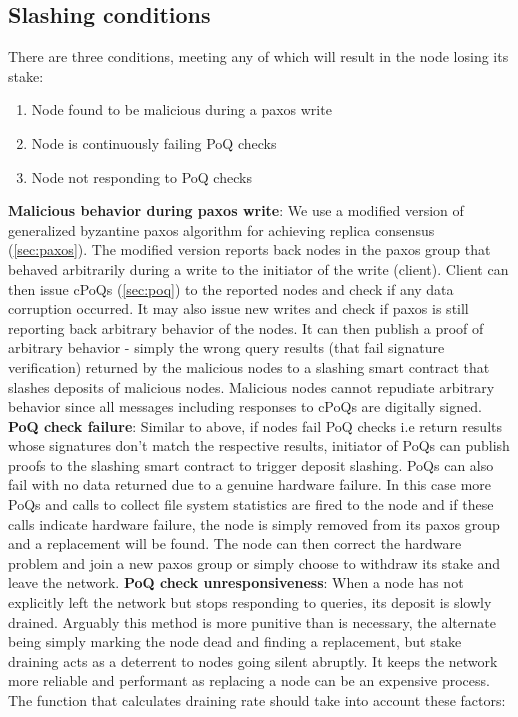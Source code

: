 \subsection{Slashing conditions} \label{sec:slashing}
 There are three conditions, meeting any of which will result in the node losing its stake:
 \begin{enumerate}
 	\item Node found to be malicious during a paxos write
 	\item Node is continuously failing PoQ checks
 	\item Node not responding to PoQ checks
 \end{enumerate}
\textbf{Malicious behavior during paxos write}: We use a modified version of generalized byzantine paxos algorithm \cite{byzantine_paxos} for achieving replica consensus (\cref{sec:paxos}). The modified version reports back nodes in the paxos group that behaved arbitrarily during a write to the initiator of the write (client). Client can then issue cPoQs (\cref{sec:poq}) to the reported nodes and check if any data corruption occurred. It may also issue new writes and check if paxos is still reporting back arbitrary behavior of the nodes. It can then publish a proof of arbitrary behavior - simply the wrong query results (that fail signature verification) returned by the malicious nodes to a slashing smart contract that slashes deposits of malicious nodes. Malicious nodes cannot repudiate arbitrary behavior since all messages including responses to cPoQs are digitally signed.
\newline\newline
\textbf{PoQ check failure}: Similar to above, if nodes fail PoQ checks i.e return results whose signatures don't match the respective results, initiator of PoQs can publish proofs to the slashing smart contract to trigger deposit slashing. PoQs can also fail with no data returned due to a genuine hardware failure. In this case more PoQs and calls to collect file system statistics are fired to the node and if these calls indicate hardware failure, the node is simply removed from its paxos group and a replacement will be found. The node can then correct the hardware problem and join a new paxos group or simply choose to withdraw its stake and leave the network.
\newline\newline
\textbf{PoQ check unresponsiveness}: When a node has not explicitly left the network but stops responding to queries, its deposit is slowly drained. Arguably this method is more punitive than is necessary, the alternate being simply marking the node dead and finding a replacement, but stake draining acts as a deterrent to nodes going silent abruptly. It keeps the network more reliable and performant as replacing a node can be an expensive process. The function that calculates draining rate should take into account these factors:
